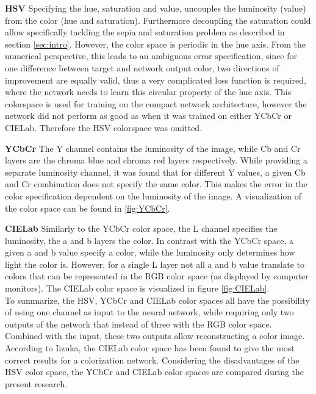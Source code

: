 \textbf{HSV} Specifying the hue, saturation and value, uncouples the luminosity (value) from the color (hue and saturation). Furthermore decoupling the saturation could allow specifically tackling the sepia and saturation problem as described in section \ref{sec:intro}. However, the color space is periodic in the hue axis. From the numerical perspective, this leads to an ambiguous error specification, since for one difference between target and network output color, two directions of improvement are equally valid, thus a very complicated loss function is required, where the network needs to learn this circular property of the hue axis. This colorspace is used for training on the compact network architecture, however the network did not perform as good as when it was trained on either YCbCr or CIELab. Therefore the HSV colorspace was omitted.

\textbf{YCbCr} The Y channel contains the luminosity of the image, while Cb and Cr layers are the chroma blue and chroma red layers respectively. While providing a separate luminosity channel, it was found that for different Y values, a given Cb and Cr combination does not specify the same color. This makes the error in the color specification dependent on the luminosity of the image. A visualization of the color space can be found in \ref{fig:YCbCr}.

\textbf{CIELab} Similarly to the YCbCr color space, the L channel specifies the luminosity, the a and b layers the color. In contrast with the YCbCr space, a given a and b value specify a color, while the luminosity only determines how light the color is. However, for a single L layer not all a and b value translate to colors that can be represented in the RGB color space (as displayed by computer monitors). The CIELab color space is visualized in figure \ref{fig:CIELab}.\\

To summarize, the HSV, YCbCr and CIELab color spaces all have the possibility of using one channel as input to the neural network, while requiring only two outputs of the network that instead of three with the RGB color space. Combined with the input, these two outputs allow reconstructing a color image. According to Iizuka, the CIELab color space has been found to give the most correct results for a colorization network\cite{IizukaSIGGRAPH2016}. Considering the disadvantages of the HSV color space, the YCbCr and CIELab color spaces are compared during the present research.


